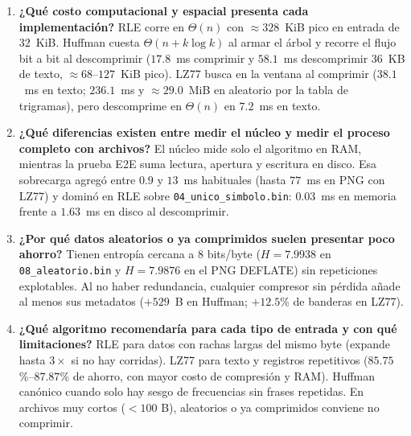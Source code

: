 \begin{enumerate}
\item \textbf{¿Qué costo computacional y espacial presenta cada implementación?}
RLE corre en $\Theta(n)$ con $\approx 328$~KiB pico en entrada de $32$~KiB. Huffman cuesta $\Theta(n+k\log k)$ al armar el árbol y recorre el flujo bit a bit al descomprimir ($17.8$~ms comprimir y $58.1$~ms descomprimir $36$~KB de texto, $\approx 68$--$127$~KiB pico). LZ77 busca en la ventana al comprimir ($38.1$~ms en texto; $236.1$~ms y $\approx 29.0$~MiB en aleatorio por la tabla de trigramas), pero descomprime en $\Theta(n)$ en $7.2$~ms en texto.

\item \textbf{¿Qué diferencias existen entre medir el núcleo y medir el proceso completo con archivos?}
El núcleo mide solo el algoritmo en RAM, mientras la prueba E2E suma lectura, apertura y escritura en disco. Esa sobrecarga agregó entre $0.9$ y $13$~ms habituales (hasta $77$~ms en PNG con LZ77) y dominó en RLE sobre \texttt{04\_unico\_simbolo.bin}: $0.03$~ms en memoria frente a $1.63$~ms en disco al descomprimir.

\item \textbf{¿Por qué datos aleatorios o ya comprimidos suelen presentar poco ahorro?}
Tienen entropía cercana a $8$ bits/byte ($H=7.9938$ en \texttt{08\_aleatorio.bin} y $H=7.9876$ en el PNG DEFLATE) sin repeticiones explotables. Al no haber redundancia, cualquier compresor sin pérdida añade al menos sus metadatos ($+529$~B en Huffman; $+12.5$\% de banderas en LZ77).

\item \textbf{¿Qué algoritmo recomendaría para cada tipo de entrada y con qué limitaciones?}
RLE para datos con rachas largas del mismo byte (expande hasta $3\times$ si no hay corridas). LZ77 para texto y registros repetitivos ($85.75$\%--$87.87$\% de ahorro, con mayor costo de compresión y RAM). Huffman canónico cuando solo hay sesgo de frecuencias sin frases repetidas. En archivos muy cortos ($<100$ B), aleatorios o ya comprimidos conviene no comprimir.
\end{enumerate}

